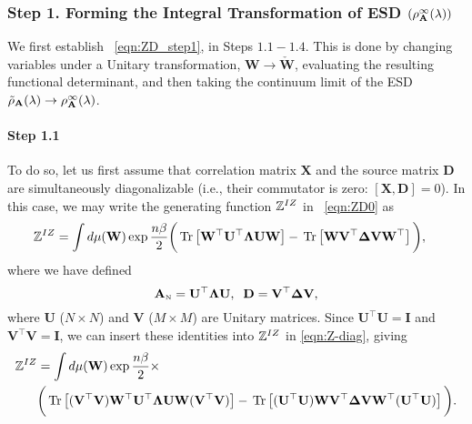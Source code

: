 \subsubsection{Step 1. Forming the Integral Transformation of ESD 
\texorpdfstring{$(\rho_{\mathbf{A}}^{\infty}(\lambda))$}{rho(lambda)}}
\label{sxn:tanaka_step1}
We first establish \EQN~\ref{eqn:ZD_step1}, in Steps $1.1-1.4$.
This is done by changing variables under a Unitary transformation, $\mathbf{W}\rightarrow\mathbf{\check{W}}$,
evaluating the resulting functional determinant,
and then taking the continuum limit of the ESD
$\tilde{\rho}_{\mathbf{A}}(\lambda)\rightarrow\rho^{\infty}_{\mathbf{A}}(\lambda)$.

\paragraph{Step 1.1}
To do so, let us first assume that \Teacher correlation matrix $\mathbf{X}$ and the source matrix $\mathbf{D}$
are simultaneously diagonalizable
(i.e., their commutator is zero: $[\mathbf{X}, \mathbf{D}]=0$).
In this case, we may write the generating function $\mathbb{Z}^{IZ}$ in \EQN~\ref{eqn:ZD0} as
%
\begin{align}
\label{eqn:Z-diag}
\mathbb{Z}^{IZ} &= \int d\mu(\mathbf{W}) \exp\frac{n\beta}{2}
 \bigg( 
\mbox{}\operatorname{Tr}\left[\mathbf{W}^{\top}\mathbf{U}^{\top}\mathbf{\Lambda}\mathbf{U}\mathbf{W}\right] 
- \mbox{}\operatorname{Tr}\left[\mathbf{W}\mathbf{V}^{\top}\mathbf{\Delta}\mathbf{V}\mathbf{W}^{\top}\right] 
\bigg)  ,
\end{align}
where we have defined
%
\begin{equation}
\label{eqn:diag-A-D}
    {\mathbf{A}}_{\text{\tiny N}}=\mathbf{U}^{\top}\mathbf{\Lambda}\mathbf{U},\;\;
    \mathbf{D}=\mathbf{V}^{\top}\mathbf{\Delta}\mathbf{V}  ,
\end{equation}
%
where $\mathbf{U}$ ($N\times N$) and $\mathbf{V}$ ($M\times M$) are Unitary matrices.
%
Since $\mathbf{U}^{\top}\mathbf{U}=\mathbf{I}$ and $\mathbf{V}^{\top}\mathbf{V}=\mathbf{I}$,
%
we can insert these identities into $\mathbb{Z}^{IZ}$ in \ref{eqn:Z-diag}, giving
%
\begin{align}\label{eqn:Z0-diag}
\mathbb{Z}^{IZ} &= \int d\mu(\mathbf{W}) \exp\frac{n\beta}{2}\times  \\ \nonumber
&\bigg(\mbox{}\operatorname{Tr}\left[(\mathbf{V}^{\top}\mathbf{V})\mathbf{W}^{\top}\mathbf{U}^{\top}\mathbf{\Lambda}\mathbf{U}\mathbf{W}(\mathbf{V}^{\top}\mathbf{V})\right] 
-\mbox{}\operatorname{Tr}\left[(\mathbf{U}^{\top} \mathbf{U})\mathbf{W}\mathbf{V}^{\top} \mathbf{\Delta} \mathbf{V}\mathbf{W}^{\top}(\mathbf{U}^{\top} \mathbf{U})\right]\bigg)  .
\end{align}

